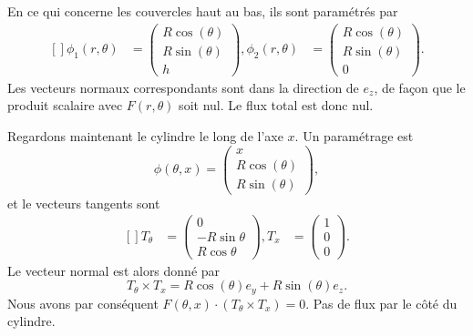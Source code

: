 \begin{example}
	En ce qui concerne les couvercles haut au bas, ils sont paramétrés par
	\begin{equation}
		\begin{aligned}[]
			\phi_1(r,\theta) & =\begin{pmatrix}
				                    R\cos(\theta) \\
				                    R\sin(\theta) \\
				                    h
			                    \end{pmatrix},
			\phi_2(r,\theta) & =\begin{pmatrix}
				                    R\cos(\theta) \\
				                    R\sin(\theta) \\
				                    0
			                    \end{pmatrix}.
		\end{aligned}
	\end{equation}
	Les vecteurs normaux correspondants sont dans la direction de \( e_z\), de façon que le produit scalaire avec \( F(r,\theta)\) soit nul. Le flux total est donc nul.

	Regardons maintenant le cylindre le long de l'axe \( x\). Un paramétrage est
	\begin{equation}
		\phi(\theta,x)=\begin{pmatrix}
			x             \\
			R\cos(\theta) \\
			R\sin(\theta)
		\end{pmatrix},
	\end{equation}
	et le vecteurs tangents sont
	\begin{equation}
		\begin{aligned}[]
			T_{\theta} & =\begin{pmatrix}
				              0            \\
				              -R\sin\theta \\
				              R\cos\theta
			              \end{pmatrix},
			T_x        & =\begin{pmatrix}
				              1 \\
				              0 \\
				              0
			              \end{pmatrix}.
		\end{aligned}
	\end{equation}
	Le vecteur normal est alors donné par
	\begin{equation}
		T_{\theta}\times T_x=R\cos(\theta)e_y+R\sin(\theta)e_z.
	\end{equation}
	Nous avons par conséquent \( F(\theta,x)\cdot (T_{\theta}\times T_x)=0\). Pas de flux par le côté du cylindre.


\end{example}
